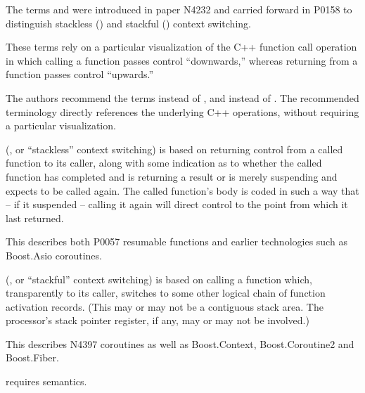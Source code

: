 The terms \susup and \susdown were introduced in paper N4232\cite{N4232} and
carried forward in P0158\cite{P0158} to distinguish stackless
(\susup) and stackful (\susdown) context switching.

These terms rely on a particular visualization of the C++ function call
operation in which calling a function passes control ``downwards,'' whereas
returning from a function passes control ``upwards.''

The authors recommend the terms \susreturn instead of \susup, and \suscall
instead of \susdown. The recommended terminology directly references the
underlying C++ operations, without requiring a particular visualization.

\susreturn (\susup, or ``stackless'' context switching) is based on returning
control from a called function to its caller, along with some indication as to
whether the called function has completed and is returning a result or is
merely suspending and expects to be called again. The called function's body
is coded in such a way that -- if it suspended -- calling it again will direct
control to the point from which it last returned.

This describes both P0057\cite{P0057} resumable functions and earlier
technologies such as Boost.Asio coroutines\cite{basiocoro}.

\suscall (\susdown, or ``stackful'' context switching) is based on calling a
function which, transparently to its caller, switches to some other logical
chain of function activation records. (This may or may not be a contiguous
stack area. The processor's stack pointer register, if any, may or may not
be involved.)

This describes N4397\cite{N4397} coroutines as well as
Boost.Context\cite{bcontext}, Boost.Coroutine2\cite{bcoroutine2} and
Boost.Fiber\cite{bfiber}.

\ectxop requires \suscall semantics.
